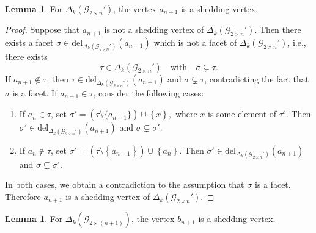 \documentclass[11pt,reqno,a4paper]{amsart}
\theoremstyle{definition}
\theoremstyle{theorem}
\newtheorem{lemma}[theorem]{Lemma}
\newcommand{\kcut}{\Delta_{k}}
\newcommand{\twoggn}{\mathcal{G}_{2\times \left(n+1\right)}}
\newcommand{\twoggp}{\mathcal{G}_{2\times n}'}
\newcommand{\lno}{\left(}
\newcommand{\rno}{\right)}
\newcommand{\lcu}{\left\{}
\newcommand{\rcu}{\right\}}
\newcommand{\del}{\mathrm{del}}
\theoremstyle{remark}
\begin{document}
\begin{lemma}\label{lemma: 2n is shedding vertex of augumented grid graph}
    For $\kcut \lno \twoggp \rno$, the vertex $a_{n+1}$ is a shedding vertex.
\end{lemma}

\begin{proof}
    Suppose that $a_{n+1}$ is not a shedding vertex of $\kcut \lno \twoggp \rno$. Then there exists a facet $\sigma \in \del_{\kcut \lno \twoggp \rno}\lno a_{n+1} \rno$ which is not a facet of $\kcut \lno \twoggp \rno$, i.e., there exists 
\[
    \tau \in \kcut \lno \twoggp \rno \quad\text{with}\quad \sigma \subsetneq \tau.
\]
If $a_{n+1} \notin \tau$, then $\tau \in \del_{\kcut \lno \twoggp \rno}\lno a_{n+1} \rno$ and $\sigma \subsetneq \tau$, contradicting the fact that $\sigma$ is a facet. If $a_{n+1} \in \tau$, consider the following cases:

\begin{enumerate}[label=\arabic*.]
    \item If $a_{n} \in \tau$, set $\sigma' = \lno \tau \setminus \{a_{n+1}\} \rno \cup \lcu x \rcu,$     where $x$ is some element of $\tau^c$. Then $\sigma' \in \del_{\kcut \lno \twoggp \rno}\lno a_{n+1} \rno$ and $\sigma \subsetneq \sigma'$.

    \item If $a_{n} \notin \tau$, set $\sigma' = \lno \tau \setminus \lcu a_{n+1} \rcu \rno \cup \lcu a_n \rcu.$ Then $\sigma' \in \del_{\kcut \lno \twoggp \rno}\lno a_{n+1} \rno$ and $\sigma \subsetneq \sigma'$.
\end{enumerate}

In both cases, we obtain a contradiction to the assumption that $\sigma$ is a facet. Therefore $a_{n+1}$ is a shedding vertex of $\kcut \lno \twoggp \rno$.
\end{proof}

\begin{lemma}\label{lemma: b_n+1 is shedding vertex}
    For $\kcut \lno \twoggn \rno$, the vertex $b_{n+1}$ is a shedding vertex.
\end{lemma}
\end{document}
